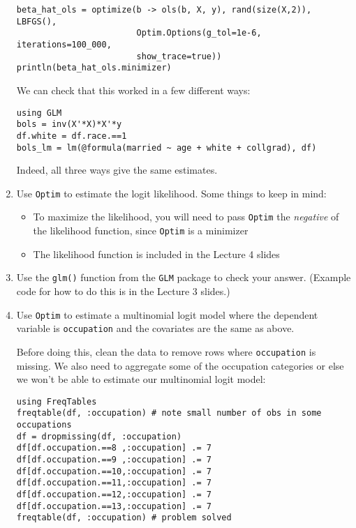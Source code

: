\documentclass[12pt,english]{article}
\begin{document}
\begin{enumerate}
\begin{verbatim}
beta_hat_ols = optimize(b -> ols(b, X, y), rand(size(X,2)), LBFGS(), 
                        Optim.Options(g_tol=1e-6, iterations=100_000, 
                        show_trace=true))
println(beta_hat_ols.minimizer)
\end{verbatim}

We can check that this worked in a few different ways:

\begin{verbatim}
using GLM
bols = inv(X'*X)*X'*y
df.white = df.race.==1
bols_lm = lm(@formula(married ~ age + white + collgrad), df)
\end{verbatim}

Indeed, all three ways give the same estimates.

\item Use \texttt{Optim} to estimate the logit likelihood. Some things to keep in mind:
\begin{itemize}
    \item To maximize the likelihood, you will need to pass \texttt{Optim} the \textit{negative} of the likelihood function, since \texttt{Optim} is a minimizer
    \item The likelihood function is included in the Lecture 4 slides
\end{itemize}

\item Use the \texttt{glm()} function from the \texttt{GLM} package to check your answer. (Example code for how to do this is in the Lecture 3 slides.)


\item Use \texttt{Optim} to estimate a multinomial logit model where the dependent variable is \texttt{occupation} and the covariates are the same as above.

Before doing this, clean the data to remove rows where \texttt{occupation} is missing. We also need to aggregate some of the occupation categories or else we won't be able to estimate our multinomial logit model:

\begin{verbatim}
using FreqTables
freqtable(df, :occupation) # note small number of obs in some occupations
df = dropmissing(df, :occupation)
df[df.occupation.==8 ,:occupation] .= 7
df[df.occupation.==9 ,:occupation] .= 7
df[df.occupation.==10,:occupation] .= 7
df[df.occupation.==11,:occupation] .= 7
df[df.occupation.==12,:occupation] .= 7
df[df.occupation.==13,:occupation] .= 7
freqtable(df, :occupation) # problem solved
\end{verbatim}


\end{enumerate}
\end{document}
